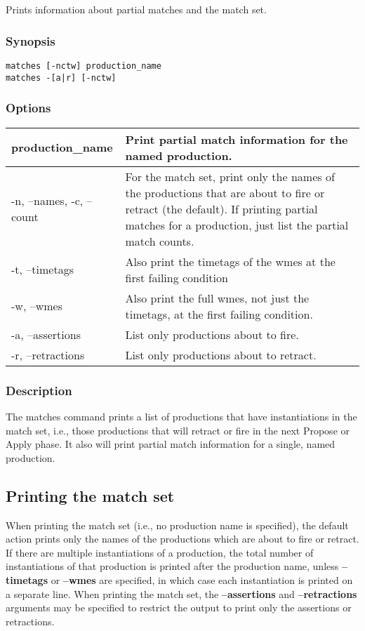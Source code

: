 \subsection{}
\label{matches}
Prints information about partial matches and the match set. 
\subsubsection*{Synopsis}
\begin{verbatim}
matches [-nctw] production_name
matches -[a|r] [-nctw]
\end{verbatim}
\subsubsection*{Options}
\begin{tabular}{|l|l|}
\hline 
production\_name & Print partial match information for the named production.  \\
 \hline 
 -n, --names, -c, --count  & For the match set, print only the names of the productions that are about to fire or retract (the default). If printing partial matches for a production, just list the partial match counts.  \\
 \hline 
 -t, --timetags  & Also print the timetags of the wmes at the first failing condition  \\
 \hline 
 -w, --wmes  & Also print the full wmes, not just the timetags, at the first failing condition.  \\
 \hline 
 -a, --assertions  & List only productions about to fire.  \\
 \hline 
 -r, --retractions  & List only productions about to retract.  \\
 \hline 
\end{tabular}
\subsubsection*{Description}
 The matches command prints a list of productions that have instantiations in the match set, i.e., those productions that will retract or fire in the next Propose or Apply phase. It also will print partial match information for a single, named production. 
\subsection*{Printing the match set}
 When printing the match set (i.e., no production name is specified), the default action prints only the names of the productions which are about to fire or retract. If there are multiple instantiations of a production, the total number of instantiations of that production is printed after the production name, unless \textbf{--timetags}
 or \textbf{--wmes}
 are specified, in which case each instantiation is printed on a separate line. 
 When printing the match set, the \textbf{--assertions}
 and \textbf{--retractions}
 arguments may be specified to restrict the output to print only the assertions or retractions. 
